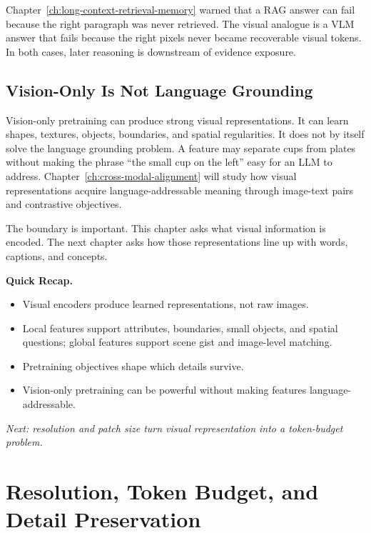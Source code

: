 \begin{tcolorbox}[colback=gray!8, colframe=gray!40, title=\textbf{Cross-Chapter Echo: Evidence Before Explanation}]
Chapter~\ref{ch:long-context-retrieval-memory} warned that a RAG answer can fail because the right paragraph was never retrieved. The visual analogue is a VLM answer that fails because the right pixels never became recoverable visual tokens. In both cases, later reasoning is downstream of evidence exposure.
\end{tcolorbox}

\subsection{Vision-Only Is Not Language Grounding}

Vision-only pretraining can produce strong visual representations. It can learn shapes, textures, objects, boundaries, and spatial regularities. It does not by itself solve the language grounding problem. A feature may separate cups from plates without making the phrase ``the small cup on the left'' easy for an LLM to address. Chapter~\ref{ch:cross-modal-alignment} will study how visual representations acquire language-addressable meaning through image-text pairs and contrastive objectives.

The boundary is important. This chapter asks what visual information is encoded. The next chapter asks how those representations line up with words, captions, and concepts.

\begin{quickrecap}
\textbf{Quick Recap.}
\begin{itemize}[nosep,leftmargin=1.5em]
  \item Visual encoders produce learned representations, not raw images.
  \item Local features support attributes, boundaries, small objects, and spatial questions; global features support scene gist and image-level matching.
  \item Pretraining objectives shape which details survive.
  \item Vision-only pretraining can be powerful without making features language-addressable.
\end{itemize}
\textit{Next: resolution and patch size turn visual representation into a token-budget problem.}
\end{quickrecap}


\section{Resolution, Token Budget, and Detail Preservation}
\label{sec:ch23-resolution-token-budget}

